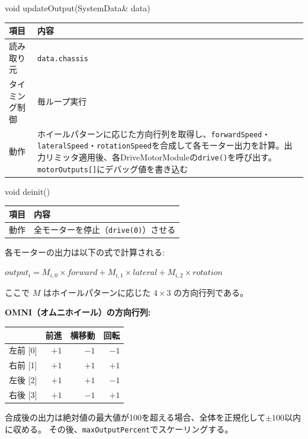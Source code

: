 \begin{funcblock}{void updateOutput(SystemData\& data)}
\begin{tabularx}{\textwidth}{l X}
\toprule
\textbf{項目} & \textbf{内容} \\
\midrule
読み取り元     & \texttt{data.chassis} \\
タイミング制御 & 毎ループ実行 \\
動作           & ホイールパターンに応じた方向行列を取得し、\texttt{forwardSpeed}・\texttt{lateralSpeed}・\texttt{rotationSpeed}を合成して各モーター出力を計算。出力リミッタ適用後、各DriveMotorModuleの\texttt{drive()}を呼び出す。\texttt{motorOutputs[]}にデバッグ値を書き込む \\
\bottomrule
\end{tabularx}
\end{funcblock}

\begin{funcblock}{void deinit()}
\begin{tabularx}{\textwidth}{l X}
\toprule
\textbf{項目} & \textbf{内容} \\
\midrule
動作   & 全モーターを停止（\texttt{drive(0)}）させる \\
\bottomrule
\end{tabularx}
\end{funcblock}

\begin{notebox}[ベクトル合成と方向行列]
各モーターの出力は以下の式で計算される:

\vspace{0.3em}
$output_i = M_{i,0} \times forward + M_{i,1} \times lateral + M_{i,2} \times rotation$
\vspace{0.3em}

\noindent ここで $M$ はホイールパターンに応じた $4 \times 3$ の方向行列である。

\medskip
\textbf{OMNI（オムニホイール）の方向行列:}
\begin{center}
\begin{tabular}{l r r r}
\toprule
& \textbf{前進} & \textbf{横移動} & \textbf{回転} \\
\midrule
左前 [0] & $+1$ & $-1$ & $-1$ \\
右前 [1] & $+1$ & $+1$ & $+1$ \\
左後 [2] & $+1$ & $+1$ & $-1$ \\
右後 [3] & $+1$ & $-1$ & $+1$ \\
\bottomrule
\end{tabular}
\end{center}

\medskip
合成後の出力は絶対値の最大値が100を超える場合、全体を正規化して$\pm 100$以内に収める。
その後、\texttt{maxOutputPercent}でスケーリングする。
\end{notebox}

